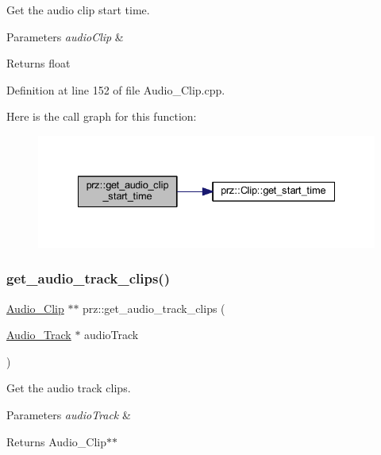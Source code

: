 Get the audio clip start time. 


\begin{DoxyParams}{Parameters}
{\em audio\+Clip} & \\
\hline
\end{DoxyParams}
\begin{DoxyReturn}{Returns}
float 
\end{DoxyReturn}


Definition at line 152 of file Audio\+\_\+\+Clip.\+cpp.

Here is the call graph for this function\+:
\nopagebreak
\begin{figure}[H]
\begin{center}
\leavevmode
\includegraphics[width=335pt]{namespaceprz_ae887fdd042262bc94a29ad81d9737093_cgraph}
\end{center}
\end{figure}
\mbox{\label{namespaceprz_a291fc379c9ff52af1a7aaa0ac7736567}} 
\subsubsection{\texorpdfstring{get\_audio\_track\_clips()}{get\_audio\_track\_clips()}}
{\footnotesize\ttfamily \mbox{\hyperlink{classprz_1_1_audio___clip}{Audio\+\_\+\+Clip}} $\ast$$\ast$ prz\+::get\+\_\+audio\+\_\+track\+\_\+clips (\begin{DoxyParamCaption}\item[{\mbox{\hyperlink{classprz_1_1_audio___track}{Audio\+\_\+\+Track}} $\ast$}]{audio\+Track }\end{DoxyParamCaption})}



Get the audio track clips. 


\begin{DoxyParams}{Parameters}
{\em audio\+Track} & \\
\hline
\end{DoxyParams}
\begin{DoxyReturn}{Returns}
Audio\+\_\+\+Clip$\ast$$\ast$ 
\end{DoxyReturn}


